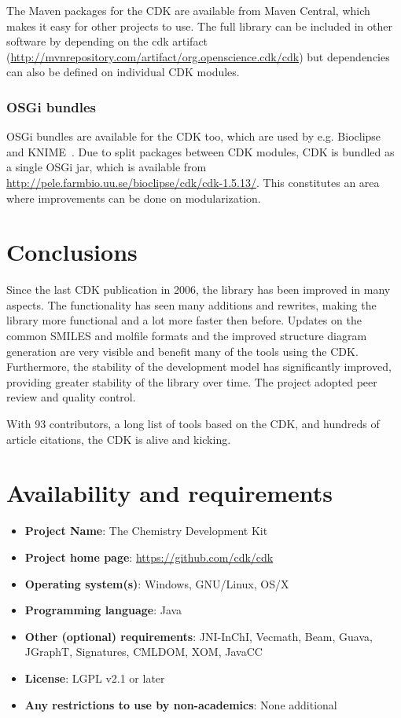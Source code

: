 \documentclass[10pt]{bmcart}
\begin{document}
The Maven packages for the CDK are available from Maven Central, which makes it
easy for other projects to use. The full library can be included in other
software by depending on the cdk artifact (\url{http://mvnrepository.com/artifact/org.openscience.cdk/cdk})
but dependencies can also be defined on individual CDK modules.

\subsubsection*{OSGi bundles}

OSGi bundles are available for the CDK too, which are used by e.g. Bioclipse~\cite{spjuth2007bioclipse,spjuth2009bioclipse} and KNIME~\cite{Beisken2013}. Due to split packages between CDK modules, CDK is bundled as a single OSGi jar, which is available from \url{http://pele.farmbio.uu.se/bioclipse/cdk/cdk-1.5.13/}. This constitutes an area where improvements can be done on modularization.



\section*{Conclusions}

Since the last CDK publication in 2006, the library has been improved in many
aspects. The functionality has seen many additions and rewrites, making the
library more functional and a lot more faster then before. Updates on the common
SMILES and molfile formats and the improved structure diagram generation are
very visible and benefit many of the tools using the CDK.
Furthermore, the stability of the development model has significantly improved,
providing greater stability of the library over time. The project adopted peer
review and quality control.

With 93 contributors, a long list of tools based on the CDK, and hundreds
of article citations, the CDK is alive and kicking.

\section*{Availability and requirements}

\begin{itemize}
\item \textbf{Project Name}: The Chemistry Development Kit
\item \textbf{Project home page}: \url{https://github.com/cdk/cdk}
\item \textbf{Operating system(s)}: Windows, GNU/Linux, OS/X
\item \textbf{Programming language}: Java
\item \textbf{Other (optional) requirements}: JNI-InChI, Vecmath, Beam, Guava, JGraphT, Signatures, CMLDOM, XOM, JavaCC
\item \textbf{License}: LGPL v2.1 or later
\item \textbf{Any restrictions to use by non-academics}: None additional
\end{itemize}
\end{document}
